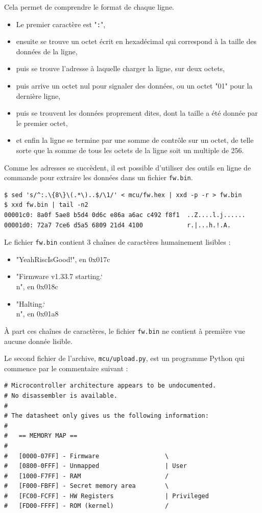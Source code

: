 \documentclass[a4paper,10pt]{article}
\newcommand{\bksl}{\char`\\} %
\begin{document}
Cela permet de comprendre le format de chaque ligne.
\begin{itemize}
\item Le premier caractère est "\texttt{:}",
\item ensuite se trouve un octet écrit en hexadécimal qui correspond à la taille des données de la ligne,
\item puis se trouve l'adresse à laquelle charger la ligne, sur deux octets,
\item puis arrive un octet nul pour signaler des données, ou un octet "01" pour la dernière ligne,
\item puis se trouvent les données proprement dites, dont la taille a été donnée par le premier octet,
\item et enfin la ligne se termine par une somme de contrôle sur un octet, de telle sorte que la somme de tous les octets de la ligne soit un multiple de 256.
\end{itemize}

Comme les adresses se succèdent, il est possible d'utiliser des outils en ligne de commande pour extraire les données dans un fichier \texttt{fw.bin}.
\begin{verbatim}
$ sed 's/^:.\{8\}\(.*\)..$/\1/' < mcu/fw.hex | xxd -p -r > fw.bin
$ xxd fw.bin | tail -n2
00001c0: 8a0f 5ae8 b5d4 0d6c e86a a6ac c492 f8f1  ..Z....l.j......
00001d0: 72a7 7ce6 d5a5 6809 21d4 4100            r.|...h.!.A.
\end{verbatim}

Le fichier \texttt{fw.bin} contient 3 chaînes de caractères humainement lisibles :
\begin{itemize}
\item "YeahRiscIsGood!", en 0x017c
\item "Firmware v1.33.7 starting.\bksl{n}", en 0x018c
\item "Halting.\bksl{n}", en 0x01a8
\end{itemize}

À part ces chaînes de caractères, le fichier \texttt{fw.bin} ne contient à première vue aucune donnée lisible.

Le second fichier de l'archive, \texttt{mcu/upload.py}, est un programme Python qui commence par le commentaire suivant :

\begin{verbatim}
# Microcontroller architecture appears to be undocumented.
# No disassembler is available.
#
# The datasheet only gives us the following information:
#
#   == MEMORY MAP ==
#
#   [0000-07FF] - Firmware                  \
#   [0800-0FFF] - Unmapped                  | User
#   [1000-F7FF] - RAM                       /
#   [F000-FBFF] - Secret memory area        \
#   [FC00-FCFF] - HW Registers              | Privileged
#   [FD00-FFFF] - ROM (kernel)              /
\end{verbatim}
\end{document}
